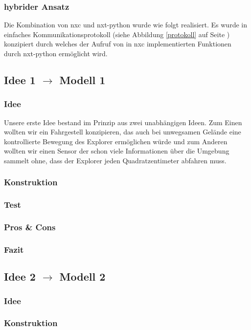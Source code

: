 \documentclass[10pt,a4paper]{scrartcl}
\begin{document}
\subsubsection{hybrider Ansatz}
Die Kombination von nxc und nxt-python wurde wie folgt realisiert. Es wurde in einfaches Kommunikationsprotokoll (siehe Abbildung \ref{protokoll} auf Seite \pageref{protokoll}) konzipiert durch welches der Aufruf von in nxc implementierten Funktionen durch nxt-python ermöglicht wird.

\subsection{Idee 1 $\rightarrow$ Modell 1}%
\subsubsection{Idee}
Unsere erste Idee bestand im Prinzip aus zwei unabhängigen Ideen. Zum Einen wollten wir ein Fahrgestell konzipieren, das auch bei unwegsamen Gelände eine kontrollierte Bewegung des Explorer ermöglichen würde und zum Anderen wollten wir einen Sensor der schon viele Informationen über die Umgebung sammelt ohne, dass der Explorer jeden Quadratzentimeter abfahren muss.
\subsubsection{Konstruktion}
\subsubsection{Test}
\subsubsection{Pros \& Cons}
\subsubsection{Fazit}
\subsection{Idee 2 $\rightarrow$ Modell 2}%
\subsubsection{Idee}
\subsubsection{Konstruktion}
\end{document}
